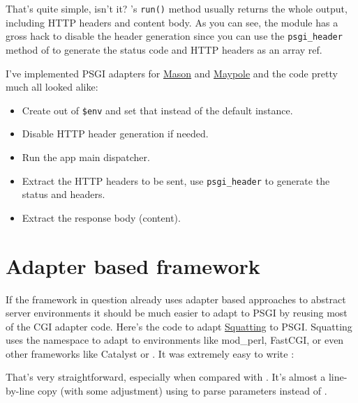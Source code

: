 
That's quite simple, isn't it? 's \lstinline!run()!
method usually returns the whole output, including HTTP headers and
content body. As you can see, the module has a gross hack to disable the
header generation since you can use the \lstinline!psgi_header! method
of  to generate the status code and HTTP headers as an array
ref.

I've implemented PSGI adapters for
\href{http://search.cpan.org/perldoc?HTML::Mason}{Mason} and
\href{http://search.cpan.org/perldoc?Maypole}{Maypole} and the code
pretty much all looked alike:

\begin{itemize}
\itemsep1pt\parskip0pt
\item
  Create  out of \lstinline!$env! and set that instead of the
  default  instance.
\item
  Disable HTTP header generation if needed.
\item
  Run the app main dispatcher.
\item
  Extract the HTTP headers to be sent, use \lstinline!psgi_header! to
  generate the status and headers.
\item
  Extract the response body (content).
\end{itemize}

\section{Adapter based framework}\label{adapter-based-framework}

If the framework in question already uses adapter based approaches to
abstract server environments it should be much easier to adapt to PSGI
by reusing most of the CGI adapter code. Here's the code to adapt
\href{http://search.cpan.org/perldoc?Squatting}{Squatting} to PSGI.
Squatting uses the  namespace to adapt to environments
like mod\_perl, FastCGI, or even other frameworks like Catalyst or
. It was extremely easy to write
\href{http://search.cpan.org/perldoc?Squatting::On::PSGI}{}:


That's very straightforward, especially when compared with
\href{http://cpansearch.perl.org/src/BEPPU/Squatting-0.70/lib/Squatting/On/CGI.pm}{}.
It's almost a line-by-line copy (with some adjustment) using
 to parse parameters instead of .

